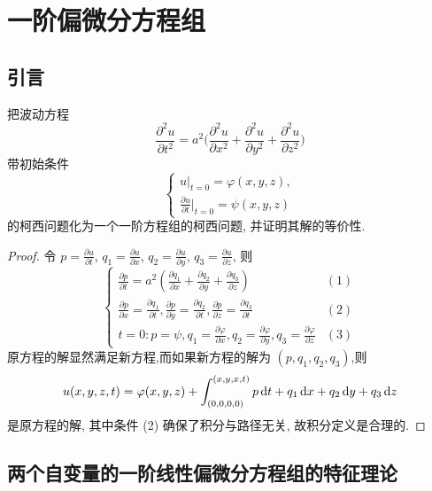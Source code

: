 \chapter{一阶偏微分方程组}

\section{引言}

\begin{exercise}
  把波动方程
  \[\frac{\partial^2u}{\partial t^2} = a^2 
    \biggl(\frac{\partial^2u}{\partial x^2} + \frac{\partial^2u}{\partial y^2}
    + \frac{\partial^2u}{\partial z^2}\biggr)\]
  带初始条件
  \[\begin{cases}
    u|_{t=0} = \varphi(x,y,z), \\
    \frac{\partial u}{\partial t}|_{t=0} = \psi(x,y,z)
  \end{cases}\]
  的柯西问题化为一个一阶方程组的柯西问题, 并证明其解的等价性.
\end{exercise}

\begin{proof}
  令 $p=\frac{\partial u}{\partial t}$, $q_1=\frac{\partial u}{\partial x}$,
  $q_2=\frac{\partial u}{\partial y}$, $q_3=\frac{\partial u}{\partial z}$, 则
  \[\begin{cases}
    \frac{\partial p}{\partial t} = a^2\left(\frac{\partial q_1}{\partial x}
      +\frac{\partial q_2}{\partial y}+\frac{\partial q_3}{\partial z}\right) & (1) \\
    \frac{\partial p}{\partial x} = \frac{\partial q_1}{\partial t},
    \frac{\partial p}{\partial y}=\frac{\partial q_2}{\partial t},
    \frac{\partial p}{\partial z}=\frac{\partial q_3}{\partial t} & (2) \\
    t = 0: p=\psi, q_1 = \frac{\partial\varphi}{\partial x},
                   q_2 = \frac{\partial\varphi}{\partial y},
                   q_3 = \frac{\partial\varphi}{\partial z} & (3)
  \end{cases}\]
  原方程的解显然满足新方程,而如果新方程的解为 $(p,q_1,q_2,q_3)$,则
  \[u(x,y,z,t) = \varphi(x,y,z)
    + \int_{(0,0,0,0)}^{(x,y,x,t)}p\mathop{}\!\mathrm{d} t+q_1\mathop{}\!\mathrm{d} x+q_2\mathop{}\!\mathrm{d} y+q_3\mathop{}\!\mathrm{d} z\]
  是原方程的解, 其中条件 (2) 确保了积分与路径无关, 故积分定义是合理的.
\end{proof}


\section{两个自变量的一阶线性偏微分方程组的特征理论}

